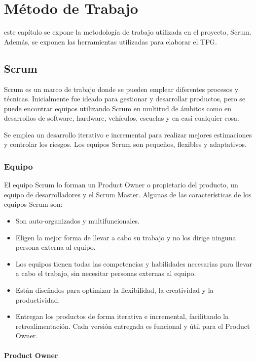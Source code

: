 \chapter{Método de Trabajo}
\label{chap:metodo}

 este capítulo se expone la metodología de trabajo utilizada en el proyecto, Scrum. Además,
se exponen las herramientas utilizadas para elaborar el \acs{TFG}.

\section{Scrum}

Scrum es un marco de trabajo donde se pueden emplear diferentes procesos y técnicas. Inicialmente 
fue ideado para gestionar y desarrollar productos, pero se puede encontrar equipos utilizando Scrum 
en multitud de ámbitos como en desarrollos de software, hardware, vehículos, escuelas y en casi cualquier 
cosa.

Se emplea un desarrollo iterativo e incremental para realizar mejores estimaciones y controlar 
los riesgos. Los equipos Scrum son pequeños, flexibles y adaptativos. 

\subsection{Equipo}

El equipo Scrum lo forman un Product Owner o propietario del producto, un equipo de desarrolladores y el Scrum Master. Algunas
de las características de los equipos Scrum son:

\begin{itemize}
	\item Son auto-organizados y multifuncionales.
	\item Eligen la mejor forma de llevar a cabo su trabajo y no los dirige ninguna persona externa al equipo.
	\item Los equipos tienen todas las competencias y habilidades necesarias para llevar a cabo el trabajo,
	sin necesitar personas externas al equipo.
	\item Están diseñados para optimizar la flexibilidad, la creatividad y la productividad.
	\item Entregan los productos de forma iterativa e incremental, facilitando la retroalimentación. Cada versión entregada
	es funcional y útil para el Product Owner.
\end{itemize}

\subsubsection{Product Owner}


